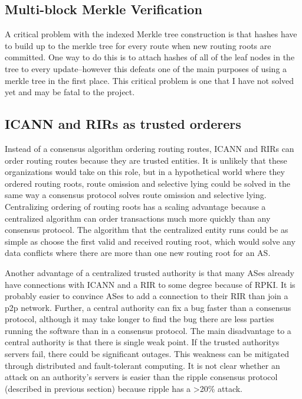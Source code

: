 \documentclass[letterpaper, 10 pt, conference]{ieeeconf}  %
\begin{document}
\subsection{Multi-block Merkle Verification}

A critical problem with the indexed Merkle tree construction is that hashes have to build up to the merkle tree for every route when new routing roots are committed. One way to do this is to attach hashes of all of the leaf nodes in the tree to every update--however this defeats one of the main purposes of using a merkle tree in the first place. This critical problem is one that I have not solved yet and may be fatal to the project.

\subsection{ICANN and RIRs as trusted orderers}

Instead of a consensus algorithm ordering routing routes, ICANN and RIRs can order routing routes because they are trusted entities. It is unlikely that these organizations would take on this role, but in a hypothetical world where they ordered routing roots, route omission and selective lying could be solved in the same way a consensus protocol solves route omission and selective lying. Centralizing ordering of routing roots has a scaling advantage because a centralized algorithm can order transactions much more quickly than any consensus protocol. The algorithm that the centralized entity runs could be as simple as choose the first valid and received routing root, which would solve any data conflicts where there are more than one new routing root for an AS. 

Another advantage of a centralized trusted authority is that many ASes already have connections with ICANN and a RIR to some degree because of RPKI. It is probably easier to convince ASes to add a connection to their RIR than join a p2p network. Further, a central authority can fix a bug faster than a consensus protocol, although it may take longer to find the bug there are less parties running the software than in a consensus protocol. The main disadvantage to a central authority is that there is single weak point. If the trusted authoritys servers fail, there could be significant outages. This weakness can be mitigated through distributed and fault-tolerant computing. It is not clear whether an attack on an authority's servers is easier than the ripple consensus protocol (described in previous section) because ripple has a >20\% attack.
\end{document}
